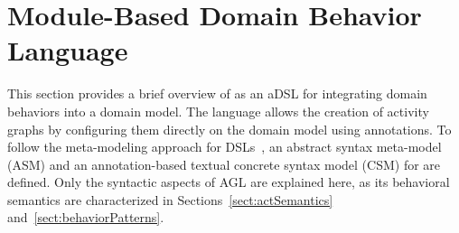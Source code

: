 %
\section{Module-Based Domain Behavior Language}\label{sect:agl} %
This section provides a brief overview of \agl as an aDSL for integrating domain behaviors into a domain model. The language allows the creation of activity graphs by configuring them directly on the domain model using annotations. To follow the meta-modeling approach for DSLs~\cite{kleppe_software_2008}, an abstract syntax meta-model (ASM) and an annotation-based textual concrete syntax model (CSM) for \agl are defined. Only the syntactic aspects of AGL are explained here, as its behavioral semantics are characterized in Sections~\ref{sect:actSemantics} and~\ref{sect:behaviorPatterns}.

